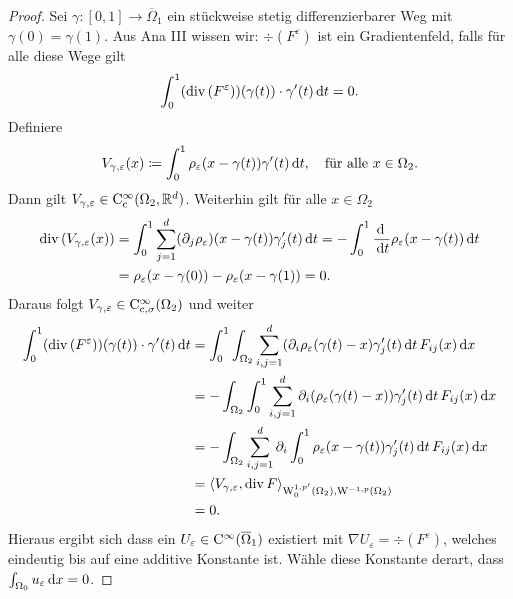 \begin{proof}
  Sei $\gamma \colon [0,1] \to \overline\Omega_1$ ein stückweise stetig differenzierbarer Weg mit $\gamma(0) = \gamma(1)$.
  Aus Ana III wissen wir: $\div(F^\varepsilon)$ ist ein Gradientenfeld, falls für alle diese Wege gilt
  $$
  \int_0^1 (\mathrm{div\,} (F^\varepsilon))(\gamma(t))\cdot \gamma'(t) \, {\operatorname{d}\!{t}} = 0.
  $$
  Definiere 
  $$
  V_{\gamma,\varepsilon}(x) \coloneqq \int_0^1 \rho_\varepsilon(x - \gamma(t))\gamma'(t) \, {\operatorname{d}\!{t}}, \quad\text{für alle } x \in \Omega_2.
  $$
  Dann gilt $V_{\gamma,\varepsilon} \in \mathrm{C}_{\mathrm{c}}^\infty(\Omega_2, \mathbb{R}^d)$.
  Weiterhin gilt für alle $x \in \Omega_2$
  \begin{align*}
    \mathrm{div\,} (V_{\gamma,\varepsilon}(x))
    &= \int_0^1 \sum_{j = 1}^d (\partial_j \rho_\varepsilon)(x - \gamma(t)) \gamma_j'(t) \, {\operatorname{d}\!{t}}
    = - \int_0^1 \frac{\, {\operatorname{d}\!{\ }}}{\, {\operatorname{d}\!{t}}} \rho_\varepsilon(x - \gamma(t)) \, {\operatorname{d}\!{t}} \\
    &= \rho_\varepsilon(x - \gamma(0)) - \rho_\varepsilon(x - \gamma(1))
    = 0.
  \end{align*}
  Daraus folgt $V_{\gamma,\varepsilon} \in \mathrm{C}_{\mathrm{c}, \sigma}^\infty(\Omega_2)$ und weiter
  \begin{align*}
    \int_0^1(\mathrm{div\,} (F^\varepsilon))(\gamma(t)) \cdot \gamma'(t) \, {\operatorname{d}\!{t}}
    &= \int_0^1 \int_{\Omega_2} \sum_{i,j = 1}^d (\partial_i \rho_\varepsilon(\gamma(t) - x) \gamma_j'(t) \, {\operatorname{d}\!{t}} \, F_{ij}(x)  \, {\operatorname{d}\!{x}} \\
    &= -\int_{\Omega_2} \int_0^1 \sum_{i,j = 1}^d \partial_i(\rho_\varepsilon(\gamma(t) - x)) \gamma_j'(t) \, {\operatorname{d}\!{t}} \, F_{ij}(x) \, {\operatorname{d}\!{x}} \\
    &= -\int_{\Omega_2} \sum_{i,j=1}^d \partial_i \int_0^1 \rho_\varepsilon(x - \gamma(t)) \gamma_j'(t) \, {\operatorname{d}\!{t}} \, F_{ij}(x) \, {\operatorname{d}\!{x}} \\
    &= \langle V_{\gamma,\varepsilon}, \mathrm{div\,} F \rangle_{\mathrm{W}_0^{1,p'}(\Omega_2), \mathrm{W}^{-1,p}(\Omega_2)} \\
    &= 0.
  \end{align*}
  Hieraus ergibt sich dass ein $U_\varepsilon \in \mathrm{C}^\infty(\overline\Omega_1)$ existiert mit $\nabla U_\varepsilon = \div(F^\varepsilon)$, welches eindeutig bis auf eine additive Konstante ist.
  Wähle diese Konstante derart, dass $\int_{\Omega_0} u_\varepsilon \, {\operatorname{d}\!{x}} = 0$.


\end{proof}
